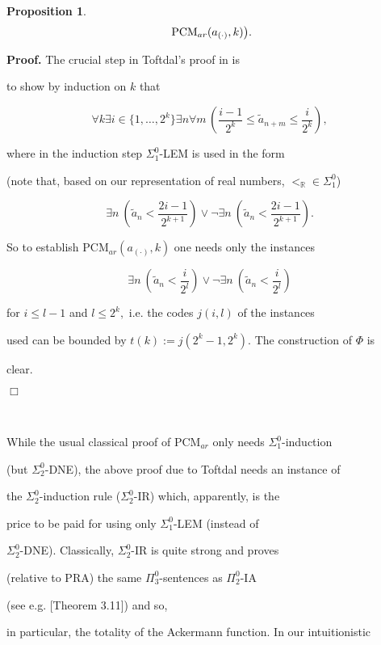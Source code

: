 \documentclass[1p]{elsarticle}
\newcommand{\RR}{\ensuremath{\mathbb{R}}}
\theoremstyle{plain}
\newtheorem{prop}[thm]{Proposition}
\theoremstyle{definition}
\theoremstyle{remark}
\theoremstyle{definition}
\begin{document}
{\begin{prop}
\[\ \mbox{\rm PCM}_{ar}(a_{(\cdot)},k)\big). \] 

\end{prop} 

{\bf Proof.} The crucial step in Toftdal's proof in \cite{Toftdal} is 

to show by induction on $k$ that 

\[ \forall k\exists i\in \{ 1,\ldots,2^k\} \exists n \forall m \, 

\left( \frac{i-1}{2^k}\le \tilde{a}_{n+m}\le \frac{i}{2^k}\right), \]

where in the induction step $\Sigma^0_1$-LEM is used in the form 

(note that, based on our representation of real numbers, $<_{\RR}\in\Sigma^0_1$) 

\[\exists n\ \left( \tilde{a}_n <\frac{2i-1}{2^{k+1}}\right) \vee 

\neg \exists n\ \left( \tilde{a}_n <\frac{2i-1}{2^{k+1}}\right). \]

So to establish PCM$_{ar}(a_{(\cdot)},k)$ one needs only the instances 

\[\exists n\ \left( \tilde{a}_n <\frac{i}{2^{l}}\right) \vee 

\neg \exists n\ \left( \tilde{a}_n <\frac{i}{2^{l}}\right) \] 

for $i\le l-1$ and $l\le 2^k,$ i.e. the codes $j(i,l)$ of the instances 

used can be bounded by $t(k):=j(2^k-1,2^k).$  The construction of $\Phi$ is 

clear. 

 \hfill $\Box$ 



\mbox{ } 



While the usual classical proof of PCM$_{ar}$ only needs $\Sigma^0_1$-induction 

(but $\Sigma^0_2$-DNE), the above proof due to Toftdal needs an instance of 

the $\Sigma^0_2$-induction rule ($\Sigma^0_2$-IR) which, apparently, is the 

price to be paid for using only $\Sigma^0_1$-LEM (instead of 

$\Sigma^0_2$-DNE). Classically, $\Sigma^0_2$-IR is quite strong and proves 

(relative to PRA) the same $\Pi^0_3$-sentences as $\Pi^0_2$-IA 

(see e.g. \cite{Sieg}[Theorem 3.11]) and so, 

in particular, the totality of the Ackermann function. In our intuitionistic 

}
\end{document}

